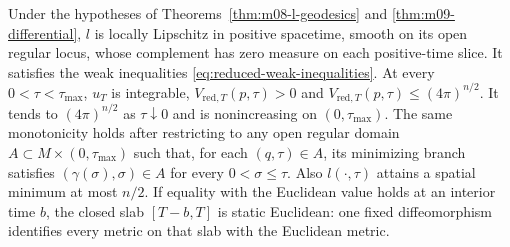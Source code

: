 \begin{theorem}
\label{thm:m10-reduced-volume}
Under the hypotheses of Theorems~\ref{thm:m08-l-geodesics} and
\ref{thm:m09-differential}, $l$ is locally Lipschitz in positive spacetime,
smooth on its open regular locus, whose complement has zero measure on
each positive-time slice.  It satisfies the weak inequalities
\eqref{eq:reduced-weak-inequalities}.  At every $0<\tau<\tau_{\max}$, $u_T$ is
integrable, $V_{\mathrm{red},T}(p,\tau)>0$ and
\(V_{\mathrm{red},T}(p,\tau)\leq(4\pi)^{n/2}\).  It tends to $(4\pi)^{n/2}$ as
$\tau\downarrow0$ and is nonincreasing on $(0,\tau_{\max})$.  The same
monotonicity holds after restricting to any open regular domain
$A\subset M\times(0,\tau_{\max})$ such that, for each $(q,\tau)\in A$,
its minimizing branch satisfies $(\gamma(\sigma),\sigma)\in A$ for every
$0<\sigma\leq\tau$.  Also $l(\cdot,\tau)$ attains a spatial minimum
at most $n/2$.  If equality with the Euclidean value holds at an interior
time $b$, the closed slab $[T-b,T]$ is static Euclidean: one fixed
diffeomorphism identifies every metric on that slab with the Euclidean metric.
\cite[Corollary 6.67, Claims 6.68--6.69, Lemma 6.71, Theorem 6.80, Proposition 6.81, Theorems 7.10 and 7.13, Claim 7.22, Corollary 7.24, Theorem 7.26, and Proposition 7.27]{MT2007}
\end{theorem}
